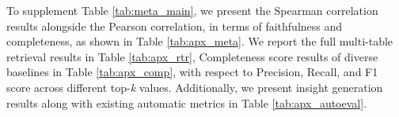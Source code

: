 To supplement Table \ref{tab:meta_main},  we present the Spearman correlation results alongside the Pearson correlation, in terms of faithfulness and completeness, as shown in Table \ref{tab:apx_meta}.
We report the full multi-table retrieval results in Table \ref{tab:apx_rtr}, \eval Completeness score results of diverse baselines in Table \ref{tab:apx_comp}, with respect to Precision, Recall, and F1 score across different top-\textit{k} values.
Additionally, we present insight generation results along with existing automatic metrics in Table \ref{tab:apx_autoeval}.